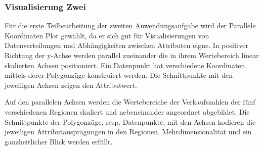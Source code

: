 \documentclass[usegeometry=true]{scrartcl}
\begin{document}

\subsubsection{Visualisierung Zwei}
Für die erste Teilbearbeitung der zweiten Anwendungsaufgabe wird der Parallele Koordinaten Plot gewählt, da er sich gut für Visualisierungen von Datenverteilungen und Abhängigkeiten zwischen Attributen eigne.\cite[11]{Chan.2006}
In positiver Richtung der y-Achse werden parallel zueinander die in ihrem Wertebereich linear skalierten Achsen positioniert.
Ein Datenpunkt hat verschiedene Koordinaten, mittels derer Polygonzüge konstruiert werden.
Die Schnittpunkte mit den jeweiligen Achsen zeigen den Attributwert.\cite[25f.]{Inselberg.1987} \cite[11]{Chan.2006}

Auf den parallelen Achsen werden die Wertebereiche der Verkaufszahlen der fünf verschiedenen Regionen skaliert und nebeneinander angeordnet abgebildet.
Die Schnittpunkte der Polygonzüge, resp. Datenpunkte, mit den Achsen kodieren die jeweiligen Attributausprägungen in den Regionen.
Mehrdimensionalität und ein ganzheitlicher Blick werden erfüllt.
\end{document}
